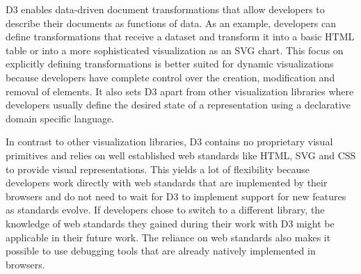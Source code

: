 D3 enables data-driven document transformations that allow developers to describe their documents as functions of data. As an example, developers can define transformations that receive a dataset and transform it into a basic HTML table or into a more sophisticated visualization as an SVG chart. This focus on explicitly defining transformations is better suited for dynamic visualizations because developers have complete control over the creation, modification and removal of elements. It also sets D3 apart from other visualization libraries where developers usually define the desired state of a representation using a declarative domain specific language.

In contrast to other visualization libraries, D3 contains no proprietary visual primitives and relies on well established web standards like HTML, SVG and CSS to provide visual representations. This yields a lot of flexibility because developers work directly with web standards that are implemented by their browsers and do not need to wait for D3 to implement support for new features as standards evolve. If developers chose to switch to a different library, the knowledge of web standards they gained during their work with D3 might be applicable in their future work. The reliance on web standards also makes it possible to use debugging tools that are already natively implemented in browsers.

